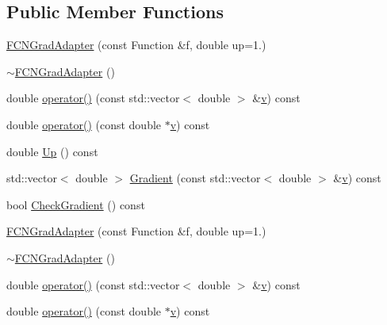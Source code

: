 \subsection*{Public Member Functions}
\begin{DoxyCompactItemize}
\item 
\mbox{\hyperlink{classROOT_1_1Minuit2_1_1FCNGradAdapter_a1836db737b7f09a9acc99b9206abed81}{F\+C\+N\+Grad\+Adapter}} (const Function \&f, double up=1.)
\item 
\mbox{\hyperlink{classROOT_1_1Minuit2_1_1FCNGradAdapter_a7b15e8e6baa870bc150e04cb4a5ad946}{$\sim$\+F\+C\+N\+Grad\+Adapter}} ()
\item 
double \mbox{\hyperlink{classROOT_1_1Minuit2_1_1FCNGradAdapter_a101e87d4c03ae367b24227b41bb258c4}{operator()}} (const std\+::vector$<$ double $>$ \&\mbox{\hyperlink{hadron__timeslice_8cc_a716fc87f5e814be3ceee2405ed6ff22a}{v}}) const
\item 
double \mbox{\hyperlink{classROOT_1_1Minuit2_1_1FCNGradAdapter_a3e3916bd20059d8e4a3f4938864ac2d7}{operator()}} (const double $\ast$\mbox{\hyperlink{hadron__timeslice_8cc_a716fc87f5e814be3ceee2405ed6ff22a}{v}}) const
\item 
double \mbox{\hyperlink{classROOT_1_1Minuit2_1_1FCNGradAdapter_a99e41f07b3f7374c0b17ef42f1c15a19}{Up}} () const
\item 
std\+::vector$<$ double $>$ \mbox{\hyperlink{classROOT_1_1Minuit2_1_1FCNGradAdapter_ae91d0453fd5e953f75551576659d6c7b}{Gradient}} (const std\+::vector$<$ double $>$ \&\mbox{\hyperlink{hadron__timeslice_8cc_a716fc87f5e814be3ceee2405ed6ff22a}{v}}) const
\item 
bool \mbox{\hyperlink{classROOT_1_1Minuit2_1_1FCNGradAdapter_a10faf0c868284a440f291465b7efd08e}{Check\+Gradient}} () const
\item 
\mbox{\hyperlink{classROOT_1_1Minuit2_1_1FCNGradAdapter_a1836db737b7f09a9acc99b9206abed81}{F\+C\+N\+Grad\+Adapter}} (const Function \&f, double up=1.)
\item 
\mbox{\hyperlink{classROOT_1_1Minuit2_1_1FCNGradAdapter_a7b15e8e6baa870bc150e04cb4a5ad946}{$\sim$\+F\+C\+N\+Grad\+Adapter}} ()
\item 
double \mbox{\hyperlink{classROOT_1_1Minuit2_1_1FCNGradAdapter_a101e87d4c03ae367b24227b41bb258c4}{operator()}} (const std\+::vector$<$ double $>$ \&\mbox{\hyperlink{hadron__timeslice_8cc_a716fc87f5e814be3ceee2405ed6ff22a}{v}}) const
\item 
double \mbox{\hyperlink{classROOT_1_1Minuit2_1_1FCNGradAdapter_a3e3916bd20059d8e4a3f4938864ac2d7}{operator()}} (const double $\ast$\mbox{\hyperlink{hadron__timeslice_8cc_a716fc87f5e814be3ceee2405ed6ff22a}{v}}) const

\end{DoxyCompactItemize}
